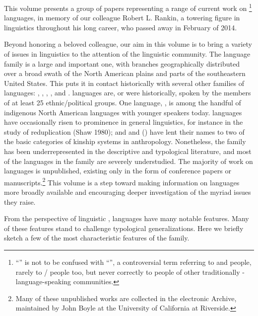 \begin{refsection}

This volume presents a group of papers representing a range of current work on \footnote{``'' is not to be confused with ``'', a controversial term referring to  and  people, rarely to / people too, but never correctly to people of other traditionally -language-speaking communities.} languages, in memory of our colleague Robert L. Rankin, a towering figure in  linguistics throughout his long career, who passed away in February of 2014.


Beyond honoring a beloved colleague, our aim in this volume is to bring a variety of issues in  linguistics to the attention of the linguistic community. The  language family is a large and important one, with branches geographically distributed over a broad swath of the North American plains and parts of the southeastern United States. This puts it in contact historically with several other families of languages: , , , , and .  languages are, or were historically, spoken by the members of at least 25 ethnic/political groups. One  language, , is among the handful of indigenous North American languages with younger speakers today.  languages have occasionally risen to prominence in general linguistics, for instance in the study of reduplication (Shaw 1980); and  and  () have lent their names to two of the basic categories of kinship systems in anthropology. Nonetheless, the  family has been underrepresented in the descriptive and typological literature, and most of the languages in the family are severely understudied. The majority of work on  languages is unpublished, existing only in the form of conference papers or manuscripts.\footnote{Many of these unpublished works are collected in the electronic  Archive, maintained by John Boyle at the University of California at Riverside.} This volume is a step toward making information on  languages more broadly available and encouraging deeper investigation of the myriad issues they raise.


From the perspective of linguistic ,  languages have many notable features. Many of these features stand to challenge typological generalizations. Here we briefly sketch a few of the most characteristic features of the  family.



\end{refsection}
